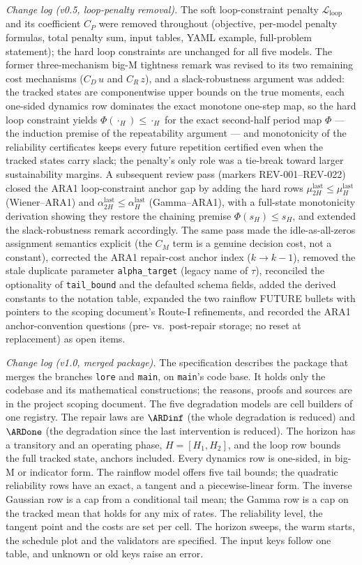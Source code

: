 \emph{Change log (v0.5, loop-penalty removal).}
The soft loop-constraint penalty $\mathcal{L}_{\mathrm{loop}}$ and its
coefficient $C_P$ were removed throughout (objective, per-model penalty
formulas, total penalty sum, input tables, YAML example, full-problem
statement); the hard loop constraints are unchanged for all five models. The
former three-mechanism big-M tightness remark was revised to its two remaining
cost mechanisms ($C_D\,u$ and $C_R\,z$), and a slack-robustness argument was
added: the tracked states are componentwise upper bounds on the true moments,
each one-sided dynamics row dominates the exact monotone one-step map, so the
hard loop constraint yields $\Phi(\cdot_H) \leq \cdot_H$ for the exact
second-half period map $\Phi$ --- the induction premise of the repeatability
argument --- and monotonicity of the reliability certificates keeps every
future repetition certified even when the tracked states carry slack; the
penalty's only role was a tie-break toward larger sustainability margins.
A subsequent review pass (markers REV-001--REV-022) closed the ARA1
loop-constraint anchor gap by adding the hard rows
$\mu^{\mathrm{last}}_{2H} \leq \mu^{\mathrm{last}}_{H}$ (Wiener--ARA1) and
$\alpha^{\mathrm{last}}_{2H} \leq \alpha^{\mathrm{last}}_{H}$ (Gamma--ARA1),
with a full-state monotonicity derivation showing they restore the chaining
premise $\Phi(s_H) \leq s_H$, and extended the slack-robustness remark
accordingly. The same pass made the idle-as-all-zeros assignment semantics
explicit (the $C_M$ term is a genuine decision cost, not a constant),
corrected the ARA1 repair-cost anchor index ($k \to k{-}1$), removed the
stale duplicate parameter \texttt{alpha\_target} (legacy name of $\tau$),
reconciled the optionality of \texttt{tail\_bound} and the defaulted schema
fields, added the derived constants to the notation table, expanded the two
rainflow FUTURE bullets with pointers to the scoping document's Route-I
refinements, and recorded the ARA1 anchor-convention questions (pre- vs.\
post-repair storage; no reset at replacement) as open items.

\emph{Change log (v1.0, merged package).}
The specification describes the package that merges the branches \texttt{lore}
and \texttt{main}, on \texttt{main}'s code base. It holds only the codebase and its
mathematical constructions; the reasons, proofs and sources are in the project
scoping document. The five degradation models are cell builders of one registry.
The repair laws are $\ARDinf$ (the whole degradation is reduced) and $\ARDone$
(the degradation since the last intervention is reduced). The horizon has a
transitory and an operating phase, $H = [H_1, H_2]$, and the loop row bounds the
full tracked state, anchors included. Every dynamics row is one-sided, in big-M
or indicator form. The rainflow model offers five tail bounds; the quadratic
reliability rows have an exact, a tangent and a piecewise-linear form. The
inverse Gaussian row is a cap from a conditional tail mean; the Gamma row is a
cap on the tracked mean that holds for any mix of rates. The reliability level,
the tangent point and the costs are set per cell. The horizon sweeps, the warm
starts, the schedule plot and the validators are specified. The input keys follow
one table, and unknown or old keys raise an error.
